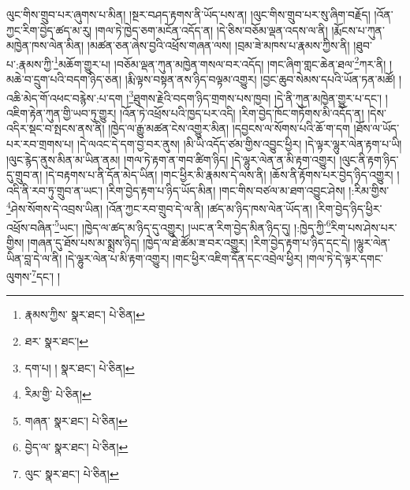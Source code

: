 ལུང་གིས་གྲུབ་པར་ཞུགས་པ་མིན། །སྔར་བཤད་རྟགས་ནི་ཡོད་པས་ན། །ལུང་གིས་གྲུབ་པར་སུ་ཞིག་བརྗོད། །འོན་ཀྱང་རིག་བྱེད་ཚད་མ་རུ། །གལ་ཏེ་ཁྱེད་ཅག་མངོན་འདོད་ན། །དེ་ཅིས་བཅོམ་ལྡན་འདས་ལ་ནི། །རྨོངས་པ་ཀུན་མཁྱེན་ཁས་ལེན་མིན། །མཚན་ཅན་ཞེས་བྱའི་འཕྲོས་གཞན་ལས། །བྲམ་ཟེ་མཁས་པ་རྣམས་ཀྱིས་ནི། །ཐུབ་པ་:རྣམས་ཀྱི་\footnote{རྣམས་ཀྱིས་  སྣར་ཐང་།  པེ་ཅིན། }མཆོག་གྱུར་པ། །བཅོམ་ལྡན་ཀུན་མཁྱེན་གསལ་བར་འདོད། །གང་ཞིག་གླང་ཆེན་ཐལ་\footnote{ཐར་  སྣར་ཐང་། }ཀར་ནི། །མཆེ་བ་དྲུག་པའི་བདག་ཉིད་ཅན། །རྨི་ལྟས་བསྟན་ནས་ཉིད་བལྟམ་འགྱུར། །བྱང་ཆུབ་སེམས་དཔའི་ཡོན་ཏན་མཚོ། །འཆི་མེད་གོ་འཕང་བརྙེས་:པ་དག །\footnote{དག་པ། །  སྣར་ཐང་།  པེ་ཅིན། }ཐུགས་རྗེའི་བདག་ཉིད་གྲགས་པས་ཁྱབ། །དེ་ནི་ཀུན་མཁྱེན་གྱུར་པ་དང་། །འཇིག་རྟེན་ཀུན་གྱི་ཡབ་ཏུ་གྱུར། །འོན་ཏེ་འཕྲོས་པའི་ཁྱད་པར་འདི། །རིག་བྱེད་ཁོང་གཏོགས་མི་འདོད་ན། །དེས་འདིར་སྡང་བ་སྤངས་ནས་ནི། །ཁྱེད་ལ་རྒྱུ་མཚན་ངེས་འགྱུར་མིན། །དབྱངས་ལ་སོགས་པའི་ཆོ་ག་དག །ཐོས་ལ་ཡོད་པར་རབ་གྲགས་པ། །དེ་ལའང་དེ་དག་བྱ་བར་ནུས། །མི་ཡི་འདོད་ཙམ་གྱིས་འབྱུང་ཕྱིར། །དེ་ལྟར་ལྷུར་ལེན་རྟག་པ་ཡི། །ལུང་རྙེད་ནུས་མིན་མ་ཡིན་ནམ། །གལ་ཏེ་རྟག་ན་གབ་ཚིག་ཉིད། །དེ་ལྷུར་ལེན་ན་མི་རྟག་འགྱུར། །ལུང་ནི་རྟག་ཉིད་དུ་གྲུབ་ན། །དེ་བརྟགས་པ་ནི་དོན་མེད་ཡིན། །གང་ཕྱིར་མི་རྣམས་དེ་ལས་ནི། །ཆོས་ནི་རྟོགས་པར་བྱེད་ཉིད་འགྱུར། །འདི་ནི་རབ་ཏུ་གྲུབ་ན་ཡང་། །རིག་བྱེད་རྟག་པ་ཉིད་ཡོད་མིན། །གང་གིས་བཙལ་མ་ཐག་འབྱུང་ཤེས། །:རིམ་གྱིས་\footnote{རིམ་གྱི་  པེ་ཅིན། }ཤེས་སོགས་དེ་འབྲས་ཡིན། །འོན་ཀྱང་རབ་གྲུབ་དེ་ལ་ནི། །ཚད་མ་ཉིད་ཁས་ལེན་ཡོད་ན། །རིག་བྱེད་ཉིད་ཕྱིར་འཕྲོས་བཞིན་\footnote{གཞན་  སྣར་ཐང་།  པེ་ཅིན། }ཡང་། །ཁྱེད་ལ་ཚད་མ་ཉིད་དུ་འགྱུར། །ཡང་ན་རིག་བྱེད་མིན་ཉིད་དུ། །:ཁྱེད་ཀྱི་\footnote{བྱེད་ལ་  སྣར་ཐང་།  པེ་ཅིན། }རིག་པས་ཤེས་པར་གྱིས། །གཞན་དུ་ཐོས་པས་མ་སྨྲས་ཉིད། །ཁྱེད་ལ་ཐེ་ཚོམ་ཟ་བར་འགྱུར། །རིག་བྱེད་རྟག་པ་ཉིད་དང་དེ། །ལྷུར་ལེན་ཡིན་བླ་དེ་ལ་ནི། །དེ་ལྷུར་ལེན་པ་མི་རྟག་འགྱུར། །གང་ཕྱིར་འཇིག་དོན་དང་འབྲེལ་ཕྱིར། །གལ་ཏེ་དེ་ལྟར་དགང་ལུགས་\footnote{ལུང་  སྣར་ཐང་།  པེ་ཅིན། }དང་། །
